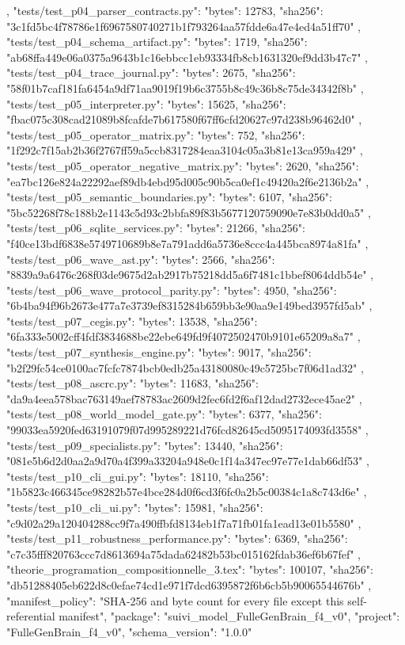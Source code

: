 {{{    },
    "tests/test_p04_parser_contracts.py": {
      "bytes": 12783,
      "sha256": "3c1fd5bc4f78786e1f6967580740271b1f793264aa57fdde6a47e4ed4a51ff70"
    },
    "tests/test_p04_schema_artifact.py": {
      "bytes": 1719,
      "sha256": "ab68ffa449e06a0375a9643b1c16ebbcc1eb93334fb8cb1631320ef9dd3b47c7"
    },
    "tests/test_p04_trace_journal.py": {
      "bytes": 2675,
      "sha256": "58f01b7caf181fa6454a9df71aa9019f19b6c3755b8c49c36b8c75de34342f8b"
    },
    "tests/test_p05_interpreter.py": {
      "bytes": 15625,
      "sha256": "fbac075c308cad21089b8fcafde7b617580f67ff6cfd20627c97d238b96462d0"
    },
    "tests/test_p05_operator_matrix.py": {
      "bytes": 752,
      "sha256": "1f292c7f15ab2b36f2767ff59a5ccb8317284eaa3104c05a3b81e13ca959a429"
    },
    "tests/test_p05_operator_negative_matrix.py": {
      "bytes": 2620,
      "sha256": "ea7bc126e824a22292aef89db4ebd95d005c90b5ca0ef1c49420a2f6e2136b2a"
    },
    "tests/test_p05_semantic_boundaries.py": {
      "bytes": 6107,
      "sha256": "5bc52268f78c188b2e1143c5d93c2bbfa89f83b5677120759090e7e83b0dd0a5"
    },
    "tests/test_p06_sqlite_services.py": {
      "bytes": 21266,
      "sha256": "f40ce13bdf6838e5749710689b8e7a791add6a5736e8ccc4a445bca8974a81fa"
    },
    "tests/test_p06_wave_ast.py": {
      "bytes": 2566,
      "sha256": "8839a9a6476c268f03de9675d2ab2917b75218dd5a6f7481c1bbef8064ddb54e"
    },
    "tests/test_p06_wave_protocol_parity.py": {
      "bytes": 4950,
      "sha256": "6b4ba94f96b2673e477a7e3739ef8315284b659bb3e90aa9e149bed3957fd5ab"
    },
    "tests/test_p07_cegis.py": {
      "bytes": 13538,
      "sha256": "6fa333e5002cff4fdf3834688be22ebe649fd9f4072502470b9101e65209a8a7"
    },
    "tests/test_p07_synthesis_engine.py": {
      "bytes": 9017,
      "sha256": "b2f29fc54ce0100ac7fcfc7874bcb0edb25a43180080c49c5725bc7f06d1ad32"
    },
    "tests/test_p08_ascrc.py": {
      "bytes": 11683,
      "sha256": "da9a4eea578bac763149aef78783ac2609d2fec6fd2f6af12dad2732ece45ae2"
    },
    "tests/test_p08_world_model_gate.py": {
      "bytes": 6377,
      "sha256": "99033ea5920fed63191079f07d995289221d76fcd82645cd5095174093fd3558"
    },
    "tests/test_p09_specialists.py": {
      "bytes": 13440,
      "sha256": "081e5b6d2d0aa2a9d70a4f399a33204a948e0c1f14a347ec97e77e1dab66df53"
    },
    "tests/test_p10_cli_gui.py": {
      "bytes": 18110,
      "sha256": "1b5823c466345ce98282b57e4bce284d0f6cd3f6fc0a2b5c00384c1a8c743d6e"
    },
    "tests/test_p10_cli_ui.py": {
      "bytes": 15981,
      "sha256": "c9d02a29a120404288cc9f7a490ffbfd8134eb1f7a71fb01fa1ead13e01b5580"
    },
    "tests/test_p11_robustness_performance.py": {
      "bytes": 6369,
      "sha256": "c7c35fff820763ccc7d8613694a75dada62482b53bc015162fdab36ef6b67fef"
    },
    "theorie_programation_compositionnelle_3.tex": {
      "bytes": 100107,
      "sha256": "db51288405eb622d8c0efae74cd1e971f7dcd6395872f6b6cb5b90065544676b"
    }
  },
  "manifest_policy": "SHA-256 and byte count for every file except this self-referential manifest",
  "package": "suivi_model_FulleGenBrain_f4_v0",
  "project": "FulleGenBrain_f4_v0",
  "schema_version": "1.0.0"
}
